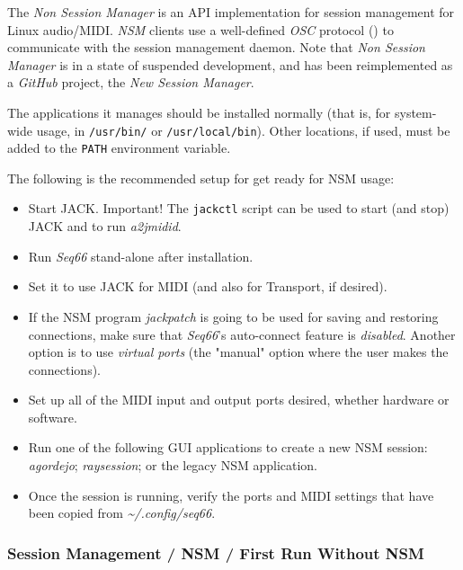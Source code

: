    The \textsl{Non Session Manager} is an API implementation for session
   management for Linux audio/MIDI.
   \textsl{NSM} clients use a well-defined
   \textsl{OSC} protocol (\cite{osc})
   to communicate with the session management daemon.
   Note that \textsl{Non Session Manager} is in a state of suspended
   development, and has been reimplemented as a \textsl{GitHub} project,
   the \textsl{New Session Manager}.

   The applications it manages should be installed normally (that is,
   for system-wide usage, in
   \texttt{/usr/bin/} or \texttt{/usr/local/bin}).
   Other locations, if used, must be added to the \texttt{PATH}
   environment variable.

   The following is the recommended setup for get ready for
   NSM usage:

   \begin{itemize}
      \item Start JACK. Important!
         The \texttt{jackctl} script can be used
         to start (and stop) JACK and to run \textsl{a2jmidid}.
      \item Run \textsl{Seq66} stand-alone after installation.
      \item Set it to use JACK for MIDI (and also for Transport,
         if desired).
      \item If the NSM program \textsl{jackpatch} is going to be used
         for saving and restoring connections, make sure that
         \textsl{Seq66}'s auto-connect feature is \textsl{disabled}.
         Another option is to use \textsl{virtual ports} (the "manual" option
         where the user makes the connections).
      \item Set up all of the MIDI input and output ports desired, whether
         hardware or software.
      \item Run one of the following GUI applications to create a
         new NSM session: \textsl{agordejo}; \textsl{raysession}; or
         the legacy NSM application.
      \item Once the session is running, verify the ports and MIDI
         settings that have been copied from
         \textsl{\textasciitilde/.config/seq66}.
   \end{itemize}

\subsubsection{Session Management / NSM / First Run Without NSM}
\label{subsec:sessions_nsm_first_run_without_nsm}

